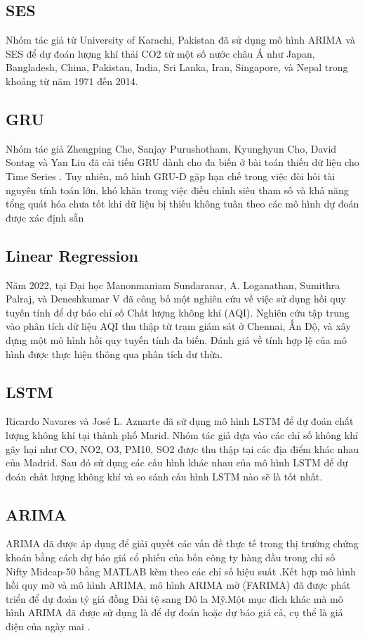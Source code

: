 \documentclass[conference]{IEEEtran}
\begin{document}
\subsection{SES}
Nhóm tác giả từ University of Karachi, Pakistan đã sử dụng mô hình ARIMA và SES để dự đoán lượng khí thải CO2 từ một số nước châu Á như Japan, Bangladesh, China, Pakistan, India, Sri Lanka, Iran, Singapore, và Nepal trong khoảng từ năm 1971 đến 2014. \cite{b11}

\subsection{GRU}
Nhóm tác giả Zhengping Che, Sanjay Purushotham, Kyunghyun Cho, David Sontag và Yan Liu đã cải tiến GRU dành cho đa biến ở bài toán thiếu dữ liệu cho Time Series \cite{che2016recurrent}. Tuy nhiên, mô hình GRU-D gặp hạn chế trong việc đòi hỏi tài nguyên tính toán lớn, khó khăn trong việc điều chỉnh siêu tham số và khả năng tổng quát hóa chưa tốt khi dữ liệu bị thiếu không tuân theo các mô hình dự đoán được xác định sẵn

\subsection{Linear Regression}
Năm 2022, tại Đại học Manonmaniam Sundaranar, A. Loganathan, Sumithra Palraj, và Deneshkumar V đã công bố một nghiên cứu về việc sử dụng hồi quy tuyến tính để dự báo chỉ số Chất lượng không khí (AQI). Nghiên cứu tập trung vào phân tích dữ liệu AQI thu thập từ trạm giám sát ở Chennai, Ấn Độ, và xây dựng một mô hình hồi quy tuyến tính đa biến. Đánh giá về tính hợp lệ của mô hình được thực hiện thông qua phân tích dư thừa. \cite{b18}

\subsection{LSTM}
Ricardo Navares và José L. Aznarte đã sử dụng mô hình LSTM để dự đoán chất lượng không khí tại thành phố Marid. Nhóm tác giả dựa vào các chỉ số không khí gây hại như CO, NO2, O3, PM10, SO2 được thu thập tại các địa điểm khác nhau của Madrid. Sau đó sử dụng các cấu hình khác nhau của mô hình LSTM để dự đoán chất lượng không khí và so sánh cấu hình LSTM nào sẽ là tốt nhất. \cite{b12}

\subsection{ARIMA}
ARIMA đã được áp dụng để giải quyết các vấn đề thực tế trong thị trường chứng khoán bằng cách dự báo giá cổ phiếu của bốn công ty hàng đầu trong chỉ số Nifty Midcap-50 bằng MATLAB kèm theo các chỉ số hiệu suất \cite{b14} .Kết hợp mô hình hồi quy mờ và mô hình ARIMA, mô hình ARIMA mờ (FARIMA) đã được phát triển để dự đoán tỷ giá đồng Đài tệ sang Đô la Mỹ\cite{b15}.Một mục đích khác mà mô hình ARIMA đã được sử dụng là để dự đoán hoặc dự báo giá cả, cụ thể là giá điện của ngày mai \cite{b16} .
\end{document}
